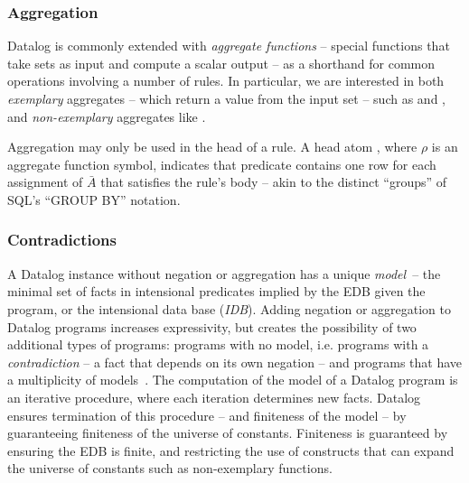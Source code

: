 \subsubsection{Aggregation}

Datalog is commonly extended with {\em aggregate functions} -- special functions that
take sets as input and compute a scalar output -- as a shorthand for common operations
involving a number of rules.
In particular, we are interested
in both {\em exemplary} aggregates -- which return a value from the input set
-- such as  and , and {\em non-exemplary} aggregates
like .


Aggregation may only be used in the head of a rule.  A head atom
, where $\rho$ is an aggregate function symbol,
indicates that predicate  contains one row for each assignment of
$\bar{A}$ that satisfies the rule's body -- akin to the distinct ``groups'' of
SQL's ``GROUP BY'' notation.

\subsubsection{Contradictions}

A Datalog instance without negation or aggregation has a unique {\em
model}~\cite{ullmanbook}-- the minimal set of facts in intensional predicates
implied by the EDB given the program, or the intensional data base ({\em IDB}).
Adding negation or aggregation to Datalog programs increases expressivity, but
creates the possibility of two additional types of programs: programs with no
model, i.e. programs with a {\em contradiction} -- a fact that depends on its
own negation -- and programs that have a multiplicity of
models~\cite{sacca-zaniolo}.  The computation of the model of a Datalog program
is an iterative procedure, where each iteration determines new facts.  Datalog
ensures termination of this procedure -- and finiteness of the model -- by
guaranteeing finiteness of the universe of constants.  Finiteness is guaranteed
by ensuring the EDB is finite, and restricting the use of constructs that can
expand the universe of constants such as non-exemplary functions.

